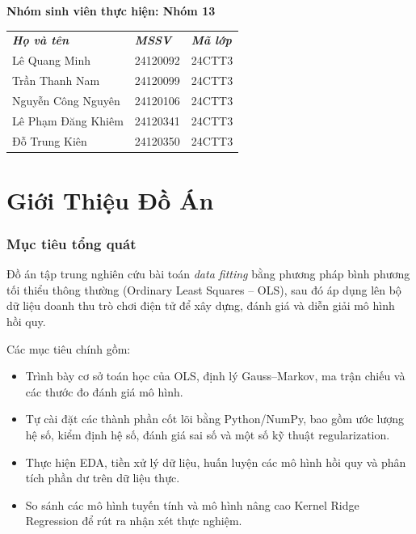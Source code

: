 \documentclass[12pt,a4paper]{article}
\begin{document}
\begin{titlepage}
    \vspace{0.45cm}
    \hspace{2cm}\textbf{Nhóm sinh viên thực hiện: Nhóm 13}

    \vspace{0.2cm}
    \hspace{2cm}
    \begin{tabular}{lll}
        \textit{\textbf{Họ và tên}} & \textit{\textbf{MSSV}} & \textit{\textbf{Mã lớp}} \\
        Lê Quang Minh      & 24120092 & 24CTT3 \\
        Trần Thanh Nam     & 24120099 & 24CTT3 \\
        Nguyễn Công Nguyên & 24120106 & 24CTT3 \\
        Lê Phạm Đăng Khiêm & 24120341 & 24CTT3 \\
        Đỗ Trung Kiên      & 24120350 & 24CTT3 \\
    \end{tabular}

    \vspace{0.6cm}
\end{titlepage}

\newpage
{}
\tableofcontents
\newpage
\hypersetup{pageanchor=true}

\part{Giới Thiệu Đồ Án}

\section{Mục tiêu tổng quát}
Đồ án tập trung nghiên cứu bài toán \textit{data fitting} bằng phương pháp bình phương tối thiểu thông thường (Ordinary Least Squares -- OLS), sau đó áp dụng lên bộ dữ liệu doanh thu trò chơi điện tử để xây dựng, đánh giá và diễn giải mô hình hồi quy.

Các mục tiêu chính gồm:
\begin{itemize}
    \item Trình bày cơ sở toán học của OLS, định lý Gauss--Markov, ma trận chiếu và các thước đo đánh giá mô hình.
    \item Tự cài đặt các thành phần cốt lõi bằng Python/NumPy, bao gồm ước lượng hệ số, kiểm định hệ số, đánh giá sai số và một số kỹ thuật regularization.
    \item Thực hiện EDA, tiền xử lý dữ liệu, huấn luyện các mô hình hồi quy và phân tích phần dư trên dữ liệu thực.
    \item So sánh các mô hình tuyến tính và mô hình nâng cao Kernel Ridge Regression để rút ra nhận xét thực nghiệm.
\end{itemize}
\end{document}

